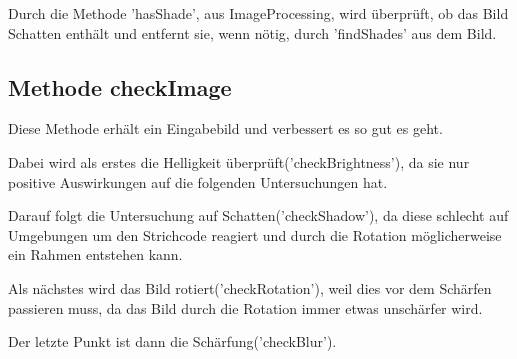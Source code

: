 Durch die Methode 'hasShade', aus ImageProcessing, wird überprüft, ob das Bild Schatten enthält und entfernt sie, wenn nötig, durch 'findShades' aus dem Bild.
 

\subsection*{Methode checkImage}
Diese Methode erhält ein Eingabebild und verbessert es so gut es geht.

Dabei wird als erstes die Helligkeit überprüft('checkBrightness'), da sie nur positive Auswirkungen auf die folgenden Untersuchungen hat.

Darauf folgt die Untersuchung auf Schatten('checkShadow'), da diese schlecht auf Umgebungen um den Strichcode reagiert und durch die Rotation möglicherweise ein Rahmen entstehen kann.

Als nächstes wird das Bild rotiert('checkRotation'), weil dies vor dem Schärfen passieren muss, da das Bild durch die Rotation immer etwas unschärfer wird.

Der letzte Punkt ist dann die Schärfung('checkBlur').